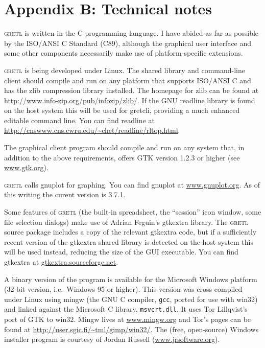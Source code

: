 \documentclass{article}
\begin{document}
\section*{Appendix B: Technical notes}
\label{technotes}

\textsc{gretl} is written in the C programming language.  I have
abided as far as possible by the ISO/ANSI C Standard (C89), although
the graphical user interface and some other components necessarily
make use of platform-specific extensions.

\textsc{gretl} is being developed under Linux.  The shared library and
command-line client should compile and run on any platform that
supports ISO/ANSI C and has the zlib compression library installed.
The homepage for zlib can be found at
\url{http://www.info-zip.org/pub/infozip/zlib/}.  If the GNU readline
library is found on the host system this will be used for
\textsf{gretcli}, providing a much enhanced editable command line.
You can find readline at
\url{http://cnswww.cns.cwru.edu/~chet/readline/rltop.html}.

The graphical client program should compile and run on any system
that, in addition to the above requirements, offers GTK version 1.2.3
or higher (see \url{www.gtk.org}).

\textsc{gretl} calls gnuplot for graphing.  You can find gnuplot at
\url{www.gnuplot.org}.  As of this writing the curent version is
3.7.1.

Some features of \textsc{gretl} (the built-in spreadsheet, the
``session'' icon window, some file selection dialogs) make use of
Adrian Feguin's \textsf{gtkextra} library.  The \textsc{gretl} source
package includes a copy of the relevant gtkextra code, but if a
sufficiently recent version of the gtkextra shared library is detected
on the host system this will be used instead, reducing the size of the
GUI executable.  You can find gtkextra at
\url{gtkextra.sourceforge.net}.

A binary version of the program is available for the Microsoft Windows
platform (32-bit version, i.e.\ Windows 95 or higher).  This version
was cross-compiled under Linux using mingw (the GNU C compiler,
\texttt{gcc}, ported for use with win32) and linked against the
Microsoft C library, \texttt{msvcrt.dll}.  It uses Tor Lillqvist's
port of GTK to win32.  Mingw lives at \url{www.mingw.org} and
Tor's pages can be found at
\url{http://user.sgic.fi/~tml/gimp/win32/}.  The (free, open-source)
Windows installer program is courtesy of Jordan Russell
(\url{www.jrsoftware.org}).
\end{document}
